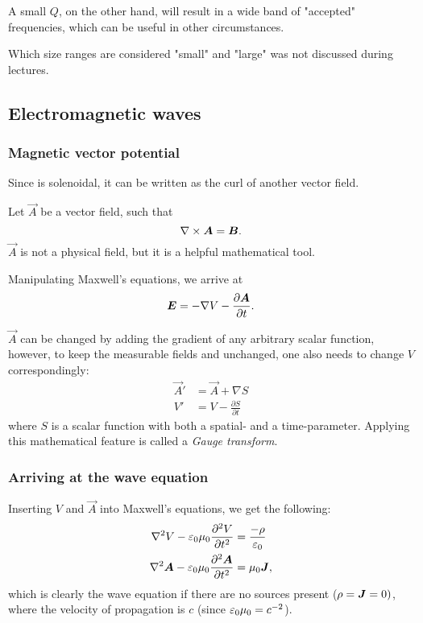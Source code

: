         A small $Q$, on the other hand, will result in a wide band of "accepted" frequencies, which can be useful in other circumstances.
    
        Which size ranges are considered "small" and "large" was not discussed during lectures. 

\subsection{Electromagnetic waves}
    \subsubsection{Magnetic vector potential}
        Since \B{} is solenoidal, it can be written as the curl of another vector field. 
        
        Let $\vec{A}$ be a vector field, such that
        \begin{equation}
            \nabla \times \bm{A} = \bm{B}.
        \end{equation}
        $\vec{A}$ is not a physical field, but it is a helpful mathematical tool. 

        Manipulating Maxwell's equations, we arrive at 
        \begin{equation}
            \bm{E} = -\nabla V - \frac{\partial \bm{A}}{\partial t}.
        \end{equation}
        
        $\vec{A}$ can be changed by adding the gradient of any arbitrary scalar function, 
        however, to keep the measurable fields \B{} and \E{} unchanged, one also needs to change $V$ correspondingly:
        \begin{align*}
            \vec{A}' &= \vec{A} + \nabla S \\
            V' &= V - \frac{\partial S}{\partial t}
        \end{align*}
        where $S$ is a scalar function with both a spatial- and a time-parameter.
        Applying this mathematical feature is called a \textit{Gauge transform}.
    \subsubsection*{Arriving at the wave equation}
        Inserting $V$ and $\vec{A}$ into Maxwell's equations, we get the following: 
        \begin{align*}
            \nabla^2V - \varepsilon_0\mu_0\frac{\partial^2V}{\partial t^2} &= \frac{-\rho}{\varepsilon_0}\\
            \nabla^2\bm{A} - \varepsilon_0\mu_0\frac{\partial^2\bm{A}}{\partial t^2} &= \mu_0\bm{J},
        \end{align*}
        which is clearly the wave equation if there are no sources present ($\rho = \bm{J} = 0)$, 
        where the velocity of propagation is $c$ (since $\varepsilon_0\mu_0 = c^{-2}$).

